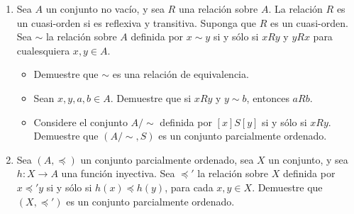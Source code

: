 \documentclass[letterpaper,11pt]{article}
\begin{document}
\begin{enumerate}
    \item Sea $A$ un conjunto no vacío, y sea $R$ una relación sobre $A$. La 
    relación $R$ es un cuasi-orden si es reflexiva y transitiva. Suponga que 
    $R$ es un cuasi-orden. Sea $\sim$ la relación sobre $A$ definida por 
    $x \sim y$ si y sólo si $xRy$ y $yRx$ para cualesquiera $x, y \in A$.

    \begin{itemize}
        \item Demuestre que $\sim$ es una relación de equivalencia.
        \item Sean $x, y, a, b \in A$. Demuestre que si $xRy$  y $y \sim b$,
        entonces $aRb$.
        \item Considere el conjunto $A/\sim$ definida por $[x]S[y]$ si y sólo 
        si $xRy$. Demuestre que $(A/\sim, S)$ es un conjunto parcialmente
        ordenado.
    \end{itemize}

    \item Sea $(A, \preceq)$ un conjunto parcialmente ordenado, sea $X$ un 
    conjunto, y sea $h: X → A$ una función inyectiva. Sea $\preceq'$ la 
    relación sobre $X$ definida por $x \preceq' y$ si y sólo si $h(x) 
    \preceq h(y)$, para cada $x, y \in X$. Demuestre que $(X, \preceq')$ es 
    un conjunto parcialmente ordenado.
\end{enumerate}
\end{document}
